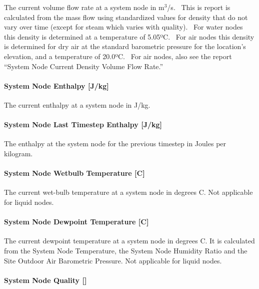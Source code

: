 The current volume flow rate at a system node in m\(^{3}\)/s.~ This is report is calculated from the mass flow using standardized values for density that do not vary over time (except for steam which varies with quality).~ For water nodes this density is determined at a temperature of 5.05ºC.~ For air nodes this density is determined for dry air at the standard barometric pressure for the location's elevation, and a temperature of 20.0ºC.~ For air nodes, also see the report ``System Node Current Density Volume Flow Rate.''

\paragraph{System Node Enthalpy {[}J/kg{]}}\label{system-node-enthalpy-jkg}

The current enthalpy at a system node in J/kg.

\paragraph{System Node Last Timestep Enthalpy {[}J/kg{]}}\label{system-node-last-timestep-enthalpy-jkg}

The enthalpy at the system node for the previous timestep in Joules per kilogram.

\paragraph{System Node Wetbulb Temperature {[}C{]}}\label{system-node-wetbulb-temperature-c}

The current wet-bulb temperature at a system node in degrees C. Not applicable for liquid nodes.

\paragraph{System Node Dewpoint Temperature {[}C{]}}\label{system-node-dewpoint-temperature-c}

The current dewpoint temperature at a system node in degrees C. It is calculated from the System Node Temperature, the System Node Humidity Ratio and the Site Outdoor Air Barometric Pressure. Not applicable for liquid nodes.

\paragraph{System Node Quality {[]}}\label{system-node-quality}

